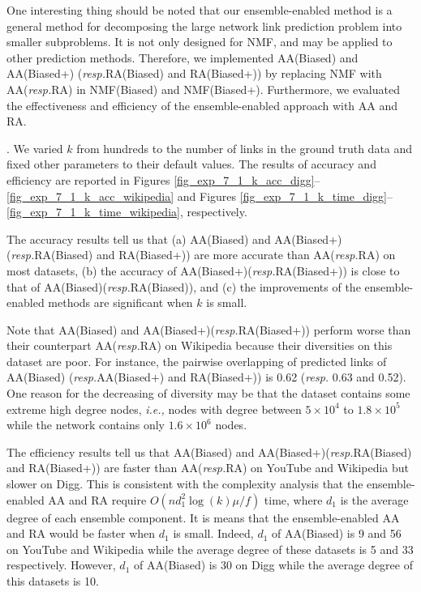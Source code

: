 \documentclass[10pt,journal,compsoc]{IEEEtran}
\newcommand{\stitle}[1]{\vspace{0.5ex}\noindent{\bf #1}}
\newcommand{\NMF}{{\sf NMF}\xspace }
\newcommand{\Biased}{{\sf NMF(Biased)}\xspace}
\newcommand{\Aa}{{\sf AA}\xspace }
\newcommand{\RA}{{\sf RA}\xspace }
\newcommand{\Digg}{{\sf Digg}\xspace}
\newcommand{\YouTube}{{\sf YouTube}\xspace}
\newcommand{\Wikipedia}{{\sf Wikipedia}\xspace}
\newcommand{\Biasedp}{{\sf NMF(Biased+)}\xspace}
\newcommand{\AABiased}{{\sf AA(Biased)}\xspace}
\newcommand{\AABiasedp}{{\sf AA(Biased+)}\xspace}
\newcommand{\RABiased}{{\sf RA(Biased)}\xspace}
\newcommand{\RABiasedp}{{\sf RA(Biased+)}\xspace}
\newcommand{\ie}{\emph{i.e.,}\xspace}
\newcommand{\resp}{\emph{resp.}\xspace}
\begin{document}
One interesting thing should be noted that our ensemble-enabled
method is a general method for decomposing the large network
link prediction problem into smaller subproblems. It is not only
designed for \NMF, and may be applied to other prediction methods.
Therefore, we implemented \AABiased and \AABiasedp
(\resp \RABiased and \RABiasedp) by replacing \NMF with \Aa (\resp \RA) in
\Biased and \Biasedp. Furthermore, we evaluated the effectiveness and efficiency
of the ensemble-enabled approach with \Aa and \RA.


\stitle{Exp-7.1: Impacts of $k$}. We varied $k$ from hundreds to the number of links in the ground truth data
and fixed other parameters to their default values. The results of accuracy
and  efficiency  are reported in Figures \ref{fig_exp_7_1_k_acc_digg}--\ref{fig_exp_7_1_k_acc_wikipedia}
and Figures \ref{fig_exp_7_1_k_time_digg}--\ref{fig_exp_7_1_k_time_wikipedia}, respectively.


The accuracy results tell us that (a) \AABiased and \AABiasedp (\resp \RABiased and \RABiasedp)
are more accurate than \Aa (\resp \RA) on most datasets,
(b) the accuracy of \AABiasedp (\resp \RABiasedp) is close to that of \AABiased (\resp \RABiased),
and (c) the improvements of the ensemble-enabled methods are significant when $k$
is small.

Note that \AABiased and \AABiasedp (\resp \RABiasedp)
perform worse than their counterpart \Aa (\resp \RA) on \Wikipedia because their diversities
on this dataset are poor. For instance, the pairwise overlapping of predicted links of \AABiased
(\resp \AABiasedp and \RABiasedp) is 0.62 (\resp 0.63 and 0.52). One reason for the decreasing
of diversity may be that the dataset contains some extreme high degree nodes,
\ie nodes with degree between $5 \times 10^4$ to $1.8 \times 10^5$ while the network contains
only $1.6 \times 10^6$ nodes.

The  efficiency  results tell us that \AABiased and \AABiasedp (\resp \RABiased and \RABiasedp)
are faster than \Aa (\resp \RA) on \YouTube and \Wikipedia but
slower on \Digg. This is consistent with the complexity analysis
that the ensemble-enabled \Aa and \RA require $O(nd_{1}^{2}\log(k)\mu/f)$ time,
where $d_1$ is the average degree of each ensemble component. It is means
that the ensemble-enabled \Aa and \RA would be faster when $d_1$ is small.
Indeed, $d_1$ of \AABiased is 9 and 56 on \YouTube and \Wikipedia while the average
degree of these datasets is 5 and 33 respectively. However, $d_1$ of \AABiased is 30
on \Digg  while the average degree of this datasets is 10.
\end{document}

